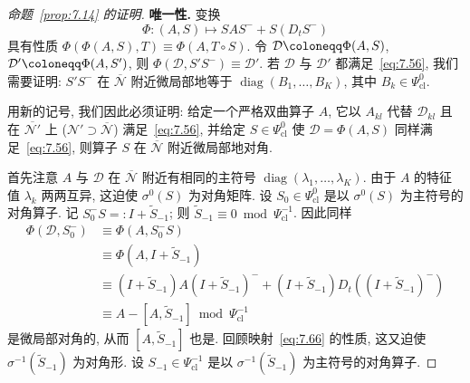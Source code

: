 \begin{proof}[命题~\ref{prop:7.14} 的证明]
\textbf{唯一性.} 变换
\begin{equation}\label{eq:7.69}
    \Phi \colon (A, S) \mapsto SAS^- + S(D_t S^-)
\end{equation}
具有性质 $\Phi(\Phi(A, S), T) \equiv \Phi(A, T \circ S)$. 令 $\mathcal{D} \defeq \Phi(A, S)$, $\mathcal{D}' \defeq \Phi(A, S')$, 则 $\Phi(\mathcal{D}, S'S^-) \equiv \mathcal{D}'$. 若 $\mathcal{D}$ 与 $\mathcal{D}'$ 都满足~\eqref{eq:7.56}, 我们需要证明: $S'S^-$ 在 $\overline{\mathcal{N}}$ 附近微局部地等于 $\operatorname{diag}(B_1, \ldots, B_K)$, 其中 $B_k \in \Psi^0_{\mathrm{cl}}$.

用新的记号, 我们因此必须证明: 给定一个严格双曲算子 $A$, 它以 $A_{kl}$ 代替 $\mathcal{D}_{kl}$ 且在 $\overline{\mathcal{N}'}$ 上 ($\mathcal{N}' \supset \overline{\mathcal{N}}$) 满足~\eqref{eq:7.56}, 并给定 $S \in \Psi^0_{\mathrm{cl}}$ 使 $\mathcal{D} = \Phi(A, S)$ 同样满足~\eqref{eq:7.56}, 则算子 $S$ 在 $\overline{\mathcal{N}}$ 附近微局部地对角.

首先注意 $A$ 与 $\mathcal{D}$ 在 $\overline{\mathcal{N}}$ 附近有相同的主符号 $\operatorname{diag}(\lambda_1, \ldots, \lambda_K)$. 由于 $A$ 的特征值 $\lambda_k$ 两两互异, 这迫使 $\sigma^0(S)$ 为对角矩阵. 设 $S_0 \in \Psi^0_{\mathrm{cl}}$ 是以 $\sigma^0(S)$ 为主符号的对角算子. 记 $S_0^- S =: I + \tilde{S}_{-1}$; 则 $\tilde{S}_{-1} \equiv 0 \bmod \Psi^{-1}_{\mathrm{cl}}$. 因此同样
\begin{equation}\label{eq:7.70}
    \begin{aligned}
        \Phi(\mathcal{D}, S_0^-) &\equiv \Phi(A, S_0^- S) \\
        &\equiv \Phi(A, I + \tilde{S}_{-1}) \\
        &\equiv (I + \tilde{S}_{-1})A(I + \tilde{S}_{-1})^- + (I + \tilde{S}_{-1})D_t\left( (I + \tilde{S}_{-1})^- \right) \\
        &\equiv A - [A, \tilde{S}_{-1}] \bmod \Psi^{-1}_{\mathrm{cl}}
    \end{aligned}
\end{equation}
是微局部对角的, 从而 $[A, \tilde{S}_{-1}]$ 也是. 回顾映射~\eqref{eq:7.66} 的性质, 这又迫使 $\sigma^{-1}(\tilde{S}_{-1})$ 为对角形. 设 $S_{-1} \in \Psi^{-1}_{\mathrm{cl}}$ 是以 $\sigma^{-1}(\tilde{S}_{-1})$ 为主符号的对角算子.


\end{proof}
